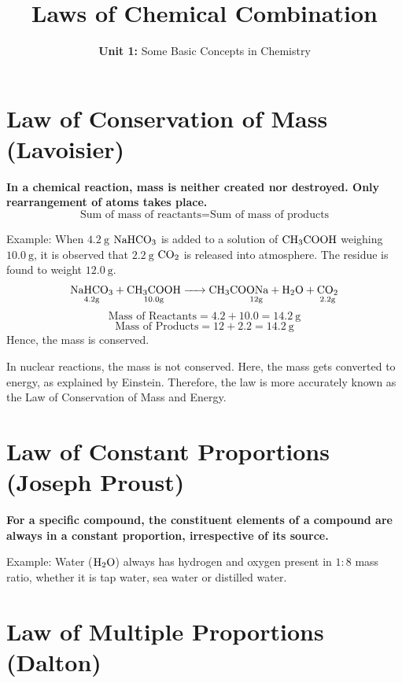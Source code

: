 \documentclass[
  14pt,
]{extarticle}
\title{\textbf{Laws of Chemical Combination}}
\subtitle{\textbf{Unit 1:} Some Basic Concepts in Chemistry}
\author{}
\date{}
\renewenvironment{quote}{\begin{myquote}}{\end{myquote}}
\newcommand{\ud}[2]{\underset{\text{#2}}{\ce{#1}}}
\begin{document}
\maketitle
\thispagestyle{fancy}

\hypertarget{law-of-conservation-of-mass-lavoisier}{%
\section{Law of Conservation of Mass
(Lavoisier)}\label{law-of-conservation-of-mass-lavoisier}}

\textbf{In a chemical reaction, mass is neither created nor destroyed.
Only rearrangement of atoms takes place.} \[
\text{Sum of mass of reactants} = 
\text{Sum of mass of products}
\]

Example: When \({4.2~\mathrm{g}}\) \(\ce{NaHCO3}\) is added to a
solution of \(\ce{CH3COOH}\) weighing \({10.0~\mathrm{g}}\), it is
observed that \({2.2~\mathrm{g}}\) \(\ce{CO2}\) is released into
atmosphere. The residue is found to weight \({12.0~\mathrm{g}}\). \[
\ce{\ud{NaHCO3}{4.2g} + \ud{CH3COOH}{10.0g} -> \ud{CH3COONa + H2O}{12g} +\ud{CO2}{2.2g}}
\] \[\text{Mass of Reactants}=4.2 + 10.0 = {14.2~\mathrm{g}}\]
\[\text{Mass of Products}=12 + 2.2 = {14.2~\mathrm{g}}\] Hence, the mass
is conserved.

\begin{quote}
In nuclear reactions, the mass is not conserved. Here, the mass gets
converted to energy, as explained by Einstein. Therefore, the law is
more accurately known as the Law of Conservation of Mass and Energy.
\end{quote}

\hypertarget{law-of-constant-proportions-joseph-proust}{%
\section{Law of Constant Proportions (Joseph
Proust)}\label{law-of-constant-proportions-joseph-proust}}

\textbf{For a specific compound, the constituent elements of a compound
are always in a constant proportion, irrespective of its source.}

Example: Water (\(\ce{H2O}\)) always has hydrogen and oxygen present in
\(1:8\) mass ratio, whether it is tap water, sea water or distilled
water.

\hypertarget{law-of-multiple-proportions-dalton}{%
\section{Law of Multiple Proportions
(Dalton)}\label{law-of-multiple-proportions-dalton}}
\end{document}
